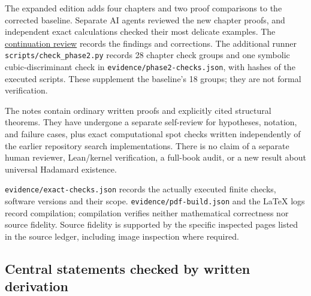 \documentclass[
  11pt,
]{article}
\begin{document}
The expanded edition adds four chapters and two proof comparisons to the
corrected baseline. Separate AI agents reviewed the new chapter proofs,
and independent exact calculations checked their most delicate examples.
The \href{PHASE2-REVIEW.md}{continuation review} records the findings
and corrections. The additional runner \texttt{scripts/check\_phase2.py}
records 28 chapter check groups and one symbolic cubic-discriminant
check in \texttt{evidence/phase2-checks.json}, with hashes of the
executed scripts. These supplement the baseline's 18 groups; they are
not formal verification.

The notes contain ordinary written proofs and explicitly cited
structural theorems. They have undergone a separate self-review for
hypotheses, notation, and failure cases, plus exact computational spot
checks written independently of the earlier repository search
implementations. There is no claim of a separate human reviewer,
Lean/kernel verification, a full-book audit, or a new result about
universal Hadamard existence.

\texttt{evidence/exact-checks.json} records the actually executed finite
checks, software versions and their scope.
\texttt{evidence/pdf-build.json} and the LaTeX logs record compilation;
compilation verifies neither mathematical correctness nor source
fidelity. Source fidelity is supported by the specific inspected pages
listed in the source ledger, including image inspection where required.

\subsection{Central statements checked by written
derivation}\label{central-statements-checked-by-written-derivation}
\end{document}
